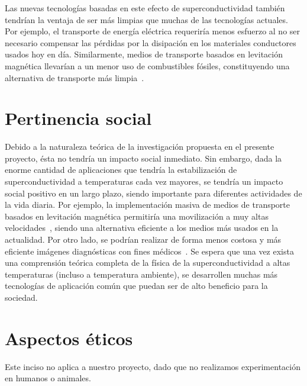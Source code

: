 \documentclass[a4paper,10pt]{article}
\begin{document}
Las nuevas tecnolog\'ias basadas en este efecto de superconductividad tambi\'en tendr\'ian la ventaja de ser m\'as limpias que muchas de las tecnolog\'ias actuales. Por ejemplo, el transporte de energ\'ia el\'ectrica requerir\'ia menos esfuerzo al no ser necesario compensar las p\'erdidas por la disipaci\'on en los materiales conductores usados hoy en d\'ia. Similarmente, medios de transporte basados en levitaci\'on magn\'etica llevar\'ian a un menor uso de combustibles f\'osiles, constituyendo una alternativa de transporte m\'as limpia~\cite{wang2009ieee}. 

\section{Pertinencia social}
Debido a la naturaleza te\'orica de la investigaci\'on propuesta en el presente proyecto, \'esta no tendr\'ia un impacto social inmediato. Sin embargo, dada la enorme cantidad de aplicaciones que tendr\'ia la estabilizaci\'on de superconductividad a temperaturas cada vez mayores, se tendr\'ia un impacto social positivo en un largo plazo, siendo importante para diferentes actividades de la vida diaria. Por ejemplo, la implementaci\'on masiva de medios de transporte basados en levitaci\'on magn\'etica permitir\'ia una movilizaci\'on a muy altas velocidades~\cite{wang2009ieee}, siendo una alternativa eficiente a los medios m\'as usados en la actualidad. Por otro lado, se podr\'ian realizar de forma menos costosa y m\'as eficiente im\'agenes diagn\'osticas con fines m\'edicos~\cite{aarnink2012euro}. Se espera que una vez exista una comprensi\'on te\'orica completa de la f\'isica de la superconductividad a altas temperaturas (incluso a temperatura ambiente), se desarrollen muchas m\'as tecnolog\'ias de aplicaci\'on com\'un que puedan ser de alto beneficio para la sociedad.

\section{Aspectos \'eticos}
Este inciso no aplica a nuestro proyecto, dado que no realizamos experimentaci\'on en humanos o animales.
\end{document}
